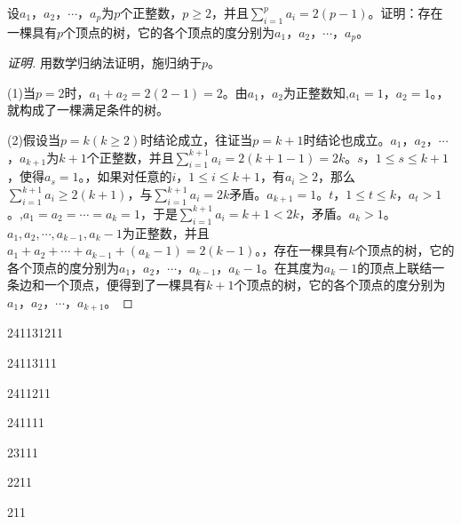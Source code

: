 \documentclass{beamer}
\begin{document}
\begin{CJK*}{UTF8}{gbsn}
\begin{frame}
\end{frame}

\begin{frame}
  \begin{Exercise}\small\justifying\let\raggedright\justifying
  设$a_1$，$a_2$，$\cdots$，$a_p$为$p$个正整数，$p\geq 2$，并且$\sum_{i=1}^pa_i=2(p-1)$。证明：存在一棵具有$p$个顶点的树，它的各个顶点的度分别为$a_1$，$a_2$，$\cdots$，$a_p$。
\end{Exercise}\pause
\begin{proof}[证明]\small\justifying\let\raggedright\justifying
  用数学归纳法证明，施归纳于$p$。\pause

  (1)当$p=2$时，$a_1+a_2=2(2-1)=2$。\pause 由$a_1$，$a_2$为正整数知,$a_1=1$，$a_2=1$。，就构成了一棵满足条件的树。\pause

  (2)假设当$p=k(k\geq 2)$时结论成立，往证当$p=k+1$时结论也成立。$a_1$，$a_2$，$\cdots$，$a_{k+1}$为$k+1$个正整数，并且$\sum_{i=1}^{k+1}a_i=2(k+1-1)=2k$。$s$，$1\leq s \leq k+1$，使得$a_s=1$。，如果对任意的$i$，$1\leq i \leq k+1$，有$a_i\geq 2$，那么$\sum_{i=1}^{k+1}a_i\geq 2(k+1)$，与$\sum_{i=1}^{k+1}a_i=2k$矛盾。$a_{k+1}=1$。$t$，$1\leq t \leq k$，$a_t>1$。,$a_1=a_2=\cdots=a_k=1$，于是$\sum_{i=1}^{k+1}a_i=k+1<2k$，矛盾。$a_k>1$。$a_1,a_2,\cdots,a_{k-1},a_{k}-1$为正整数，并且$a_1 + a_2 + \cdots + a_{k-1} + (a_{k}-1) = 2(k-1)$。，存在一棵具有$k$个顶点的树，它的各个顶点的度分别为$a_1$，$a_2$，$\cdots$，$a_{k-1}$，$a_k-1$。\pause 在其度为$a_k-1$的顶点上联结一条边和一个顶点，便得到了一棵具有$k+1$个顶点的树，它的各个顶点的度分别为$a_1$，$a_2$，$\cdots$，$a_{k+1}$。
\end{proof}
\end{frame}
\begin{frame}
  \begin{minipage}{0.3\linewidth}
    241131211\pause

    24113111\pause

    2411211\pause

    241111\pause

    23111\pause

    2211\pause

    211\pause


\end{minipage}
\end{frame}
\end{CJK*}
\end{document}
